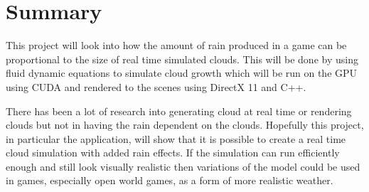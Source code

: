 \section{Summary}
This project will look into how the amount of rain produced in a game can be proportional to the size of real time simulated clouds. This will be done by using fluid dynamic equations to simulate cloud growth which will be run on the GPU using CUDA and rendered to the scenes using DirectX 11 and C++. 

There has been a lot of research into generating cloud at real time or rendering clouds but not in having the rain dependent on the clouds. Hopefully this project, in particular the application, will show that it is possible to create a real time cloud simulation with added rain effects. If the simulation can run efficiently enough and still look visually realistic then variations of the model could be used in games, especially open world games, as a form of more realistic weather.  \textsl{}